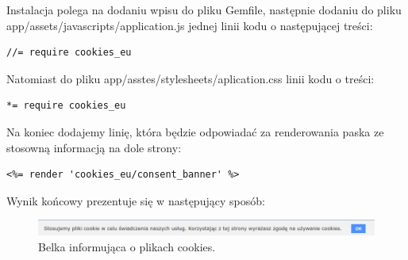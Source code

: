 \documentclass[openright]{xmgr}
\begin{document}
Instalacja polega na dodaniu wpisu do pliku Gemfile, następnie dodaniu do pliku app/assets/javascripts/application.js jednej linii kodu o następującej treści:
\begin{lstlisting}[language=ruby2, caption={Kod odpowiadający dodanie bibliotek javascript}]
//= require cookies_eu
\end{lstlisting}
Natomiast do pliku app/asstes/stylesheets/aplication.css linii kodu o treści:
\begin{lstlisting}[language=ruby2, caption={Kod odpowiadający dodanie bibliotek kaskadowych arkuszy stylów}]
*= require cookies_eu
\end{lstlisting}
Na koniec dodajemy linię, która będzie odpowiadać za renderowania paska ze stosowną informacją na dole strony:
\begin{lstlisting}[language=ruby2, caption={Kod renderujący pasek z informacją o ciasteczkach}]
<%= render 'cookies_eu/consent_banner' %>
\end{lstlisting}

Wynik końcowy prezentuje się w następujący sposób:
\begin{figure}[!tbh]
\centering
\includegraphics[width=\linewidth]{fig/cookies}
\caption{Belka informująca o plikach cookies.}
\end{figure}
\end{document}

